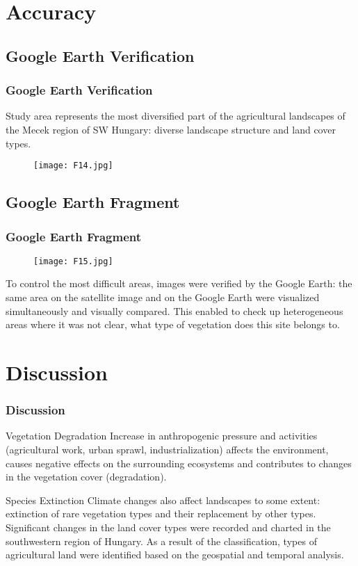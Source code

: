 \documentclass[pdflatex,compress,10pt,
	xcolor={dvipsnames,dvipsnames,svgnames,x11names,table},
	hyperref={
	breaklinks = true, 
	pdfauthor={Lemenkova Polina}, 
	pdfsubject={Preentation}, 
	pdfcreator={Lemenkova Polina}, 
	pdfproducer={Lemenkova Polina}, 
	citecolor=NavyBlue, 
	urlcolor = NavyBlue, 
	breaklinks = true}]{beamer}
\begin{document}
\section{Accuracy}
\subsection{Google Earth Verification}
\begin{frame}\frametitle{Google Earth Verification}
Study area represents the most diversified part of the agricultural landscapes of the Mecek region of SW Hungary: diverse landscape structure and land cover types.

\begin{figure}[H]
	\centering
		\texttt{[image: F14.jpg]}
\end{figure}

\end{frame}

\subsection{Google Earth Fragment}
\begin{frame}\frametitle{Google Earth Fragment}
\begin{figure}[H]
	\centering
		\texttt{[image: F15.jpg]}
\end{figure}
To control the most difficult areas, images were verified by the Google Earth: the same area on the satellite image and on the Google Earth were visualized simultaneously and visually compared. This enabled to check up heterogeneous areas where it was not clear, what type of vegetation does this site belongs to.
\end{frame}

\section{Discussion}
\begin{frame}\frametitle{Discussion}

\begin{alertblock}{Vegetation Degradation}
Increase in anthropogenic pressure and activities (agricultural work, urban sprawl, industrialization) affects the environment, causes negative effects on the surrounding ecosystems and contributes to changes in the vegetation cover (degradation).
\end{alertblock}

\begin{block}{Species Extinction}
Climate changes also affect landscapes to some extent: extinction of rare vegetation types and their replacement by other types. Significant changes in the land cover types were recorded and charted in the southwestern region of Hungary.
As a result of the classification, types of agricultural land were identified based on the geospatial and temporal analysis.
\end{block}
\end{frame}
\end{document}

